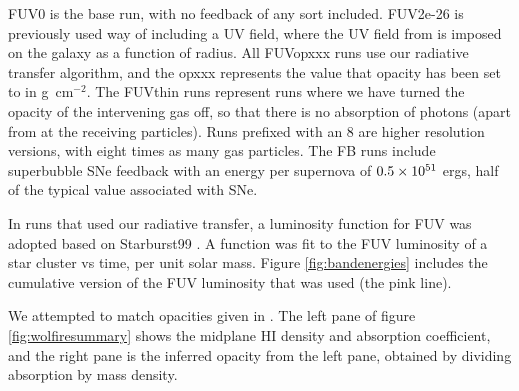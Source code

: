 FUV0 is the base run, with no feedback of any sort included. FUV2e-26 is previously used way of including a UV field, where the UV field from \citet{wolfireEt03} is imposed on the galaxy as a function of radius. All FUVopxxx runs use our radiative transfer algorithm, and the opxxx represents the value that opacity has been set to in g~cm$^{-2}$. The FUVthin runs represent runs where we have turned the opacity of the intervening gas off, so that there is no absorption of photons (apart from at the receiving particles). Runs prefixed with an 8 are higher resolution versions, with eight times as many gas particles. The FB runs include superbubble SNe feedback with an energy per supernova of $0.5\times 10^{51}$ ergs, half of the typical value associated with SNe.

In runs that used our radiative transfer, a luminosity function for FUV was adopted based on Starburst99 \citep{leithererEt99}. A function was fit to the FUV luminosity of a star cluster vs time, per unit solar mass. Figure \ref{fig:bandenergies} includes the cumulative version of the FUV luminosity that was used (the pink line).

We attempted to match opacities given in \citet{wolfireEt03}. The left pane of figure \ref{fig:wolfiresummary} shows the midplane HI density and absorption coefficient, and the right pane is the inferred opacity from the left pane, obtained by dividing absorption by mass density.

